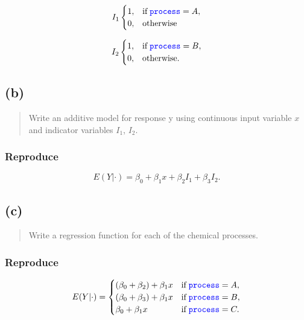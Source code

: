 \documentclass[
]{article}
\begin{document}
\[
  I_1
  \begin{cases}
    1, & \text{if} \;\textcolor{blue}{\texttt{process}} = A,\\
    0, & \text{otherwise}
  \end{cases}
\]

\[
  I_2
  \begin{cases}
    1, & \text{if} \;\textcolor{blue}{\texttt{process}} = B,\\
    0, & \text{otherwise}.
  \end{cases}
\]

\hypertarget{b-2}{%
\subsection{(b)}\label{b-2}}

\begin{quote}
Write an additive model for response y using continuous input variable
\(x\) and indicator variables \(I_1\), \(I_2\).
\end{quote}

\hypertarget{reproduce-13}{%
\subsubsection{Reproduce}\label{reproduce-13}}

\[
  E(Y|\cdot) = \beta_0 + \beta_1 x + \beta_2 I_1 + \beta_3 I_2.
\]

\hypertarget{c-2}{%
\subsection{(c)}\label{c-2}}

\begin{quote}
Write a regression function for each of the chemical processes.
\end{quote}

\hypertarget{reproduce-14}{%
\subsubsection{Reproduce}\label{reproduce-14}}

\[
  E(Y|\cdot) = 
  \begin{cases}
    (\beta_0 + \beta_2) + \beta_1 x & \text{if} \;\textcolor{blue}{\texttt{process}} = A,\\
    (\beta_0 + \beta_3) + \beta_1 x & \text{if} \;\textcolor{blue}{\texttt{process}} = B,\\
    \beta_0 + \beta_1 x             & \text{if} \;\textcolor{blue}{\texttt{process}} = C.
  \end{cases}
\]
\end{document}
